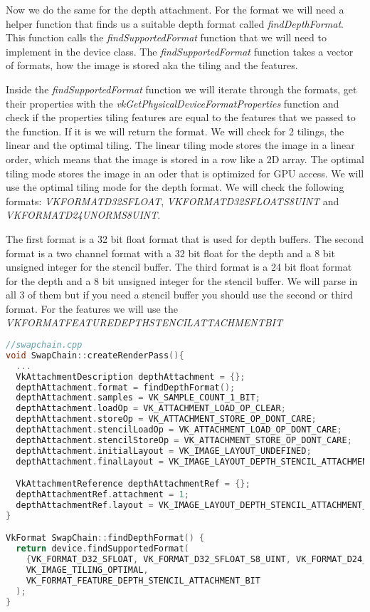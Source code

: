\documentclass[12pt]{report} \usepackage{preamble}
\begin{document}
Now we do the same for the depth attachment. For the format we will need a helper function that finds us a suitable
depth format called \textit{findDepthFormat}. This function calls the \textit{findSupportedFormat} function that we
will need to implement in the device class. The \textit{findSupportedFormat} function takes a vector of formats,
how the image is stored aka the tiling and the features.

Inside the \textit{findSupportedFormat} function we will iterate through the formats, get their properties with the
\textit{vkGetPhysicalDeviceFormatProperties} function and check if the properties tiling features are equal to the
features that we passed to the function. If it is we will return the format. We will check for 2 tilings,
the linear and the optimal tiling. The linear tiling mode stores the image in a linear order, which means that the
image is stored in a row like a 2D array. The optimal tiling mode stores the image in an oder that is optimized for
\ac{GPU} access. We will use the optimal tiling mode for the depth format. We will check the following formats:
\textit{VK\textunderscore FORMAT\textunderscore D32\textunderscore SFLOAT},
\textit{VK\textunderscore FORMAT\textunderscore D32\textunderscore SFLOAT\textunderscore S8\textunderscore UINT} and
\textit{VK\textunderscore FORMAT\textunderscore D24\textunderscore UNORM\textunderscore S8\textunderscore UINT}.

The first format is a 32 bit float format that is used for depth buffers. The second format is a two channel format
with a 32 bit float for the depth and a 8 bit unsigned integer for the stencil buffer. The third format is a 24 bit
float format for the depth and a 8 bit unsigned integer for the stencil buffer. We will parse in all 3 of them but if you need
a stencil buffer you should use the second or third format. For the features we will use the
\textit{VK\textunderscore FORMAT\textunderscore FEATURE\textunderscore DEPTH\textunderscore STENCIL\textunderscore ATTACHMENT\textunderscore BIT}

\begin{lstlisting}[language=C++]
//swapchain.cpp
void SwapChain::createRenderPass(){
  ...
  VkAttachmentDescription depthAttachment = {};
  depthAttachment.format = findDepthFormat();
  depthAttachment.samples = VK_SAMPLE_COUNT_1_BIT;
  depthAttachment.loadOp = VK_ATTACHMENT_LOAD_OP_CLEAR;
  depthAttachment.storeOp = VK_ATTACHMENT_STORE_OP_DONT_CARE;
  depthAttachment.stencilLoadOp = VK_ATTACHMENT_LOAD_OP_DONT_CARE;
  depthAttachment.stencilStoreOp = VK_ATTACHMENT_STORE_OP_DONT_CARE;
  depthAttachment.initialLayout = VK_IMAGE_LAYOUT_UNDEFINED;
  depthAttachment.finalLayout = VK_IMAGE_LAYOUT_DEPTH_STENCIL_ATTACHMENT_OPTIMAL;

  VkAttachmentReference depthAttachmentRef = {};
  depthAttachmentRef.attachment = 1;
  depthAttachmentRef.layout = VK_IMAGE_LAYOUT_DEPTH_STENCIL_ATTACHMENT_OPTIMAL;
}

VkFormat SwapChain::findDepthFormat() {
  return device.findSupportedFormat(
    {VK_FORMAT_D32_SFLOAT, VK_FORMAT_D32_SFLOAT_S8_UINT, VK_FORMAT_D24_UNORM_S8_UINT},
    VK_IMAGE_TILING_OPTIMAL,
    VK_FORMAT_FEATURE_DEPTH_STENCIL_ATTACHMENT_BIT
  );
}
\end{lstlisting}
\end{document}
